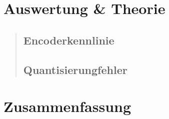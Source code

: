 \section{Auswertung \& Theorie}
\begin{quote}
    
    \subsection{Encoderkennlinie}
    
    \begin{quote}
        
    
    
    \end{quote}
    
    
    \subsection{Quantisierungfehler}
    
    \begin{quote}
        
    \end{quote}    
    
\end{quote}

\section{Zusammenfassung}
\begin{quote}
	
 
    
\end{quote} %


